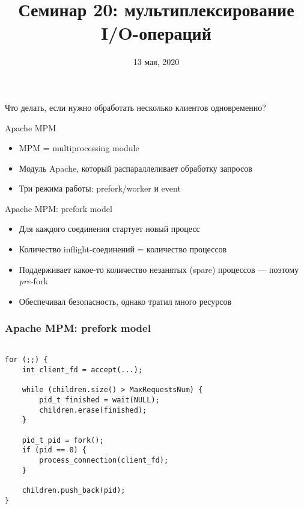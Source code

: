 \documentclass[10pt,pdf,hyperref={unicode}]{beamer}
\title{Семинар 20: мультиплексирование I/O-операций}
\date{13 мая, 2020}
\begin{document}
\begin{frame}
  \titlepage
\end{frame}

\begin{frame}
\Huge{Что делать, если нужно обработать несколько клиентов одновременно?}
\end{frame}

\begin{frame}{Apache MPM}
\begin{itemize}
    \item MPM = multiprocessing module
    \item Модуль Apache, который распараллеливает обработку запросов
    \item Три режима работы: prefork/worker и event
\end{itemize}
\end{frame}

\begin{frame}{Apache MPM: prefork model}
\begin{itemize}
    \item Для каждого соединения стартует новый процесс
    \item Количество inflight-соединений = количество процессов
    \item Поддерживает какое-то количество незанятых (spare) процессов — поэтому \emph{pre-}fork
    \item Обеспечивал безопасность, однако тратил много ресурсов
\end{itemize}
\end{frame}

\begin{frame}[fragile]
\frametitle{Apache MPM: prefork model}
\begin{center}
\begin{minipage}{0.95\textwidth}
\begin{verbatim}

for (;;) {
    int client_fd = accept(...);

    while (children.size() > MaxRequestsNum) {
        pid_t finished = wait(NULL);
        children.erase(finished);
    }

    pid_t pid = fork();
    if (pid == 0) {
        process_connection(client_fd);
    }

    children.push_back(pid);
}

\end{verbatim}
\end{minipage}
\end{center}
\end{frame}
\end{document}
